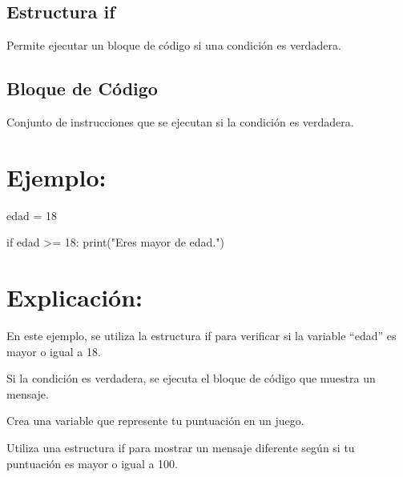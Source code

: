 \documentclass[
  a4paper,
  onepage,
  openany]{scrreprt}
\newenvironment{Shaded}{\begin{snugshade}}{\end{snugshade}}
\newcommand{\BuiltInTok}[1]{\textcolor[rgb]{0.00,0.23,0.31}{#1}}
\newcommand{\ControlFlowTok}[1]{\textcolor[rgb]{0.00,0.23,0.31}{#1}}
\newcommand{\DecValTok}[1]{\textcolor[rgb]{0.68,0.00,0.00}{#1}}
\newcommand{\NormalTok}[1]{\textcolor[rgb]{0.00,0.23,0.31}{#1}}
\newcommand{\OperatorTok}[1]{\textcolor[rgb]{0.37,0.37,0.37}{#1}}
\newcommand{\StringTok}[1]{\textcolor[rgb]{0.13,0.47,0.30}{#1}}
\begin{document}
\hypertarget{estructura-if}{%
\subsection{Estructura if}\label{estructura-if}}

Permite ejecutar un bloque de código si una condición es verdadera.

\hypertarget{bloque-de-cuxf3digo}{%
\subsection{Bloque de Código}\label{bloque-de-cuxf3digo}}

Conjunto de instrucciones que se ejecutan si la condición es verdadera.

\hypertarget{ejemplo-28}{%
\section{Ejemplo:}\label{ejemplo-28}}

\begin{Shaded}
\begin{Highlighting}[]
\NormalTok{edad }\OperatorTok{=} \DecValTok{18}

\ControlFlowTok{if}\NormalTok{ edad }\OperatorTok{\textgreater{}=} \DecValTok{18}\NormalTok{:}
    \BuiltInTok{print}\NormalTok{(}\StringTok{"Eres mayor de edad."}\NormalTok{)}
\end{Highlighting}
\end{Shaded}

\hypertarget{explicaciuxf3n-28}{%
\section{Explicación:}\label{explicaciuxf3n-28}}

En este ejemplo, se utiliza la estructura if para verificar si la
variable ``edad'' es mayor o igual a 18.

Si la condición es verdadera, se ejecuta el bloque de código que muestra
un mensaje.

\begin{tcolorbox}[enhanced jigsaw, breakable, opacityback=0, toptitle=1mm, coltitle=black, toprule=.15mm, rightrule=.15mm, colframe=quarto-callout-important-color-frame, opacitybacktitle=0.6, arc=.35mm, title=\textcolor{quarto-callout-important-color}{\faExclamation}\hspace{0.5em}{Actividad Práctica:}, titlerule=0mm, colbacktitle=quarto-callout-important-color!10!white, bottomtitle=1mm, bottomrule=.15mm, colback=white, left=2mm, leftrule=.75mm]

Crea una variable que represente tu puntuación en un juego.

Utiliza una estructura if para mostrar un mensaje diferente según si tu
puntuación es mayor o igual a 100.

\end{tcolorbox}
\end{document}
